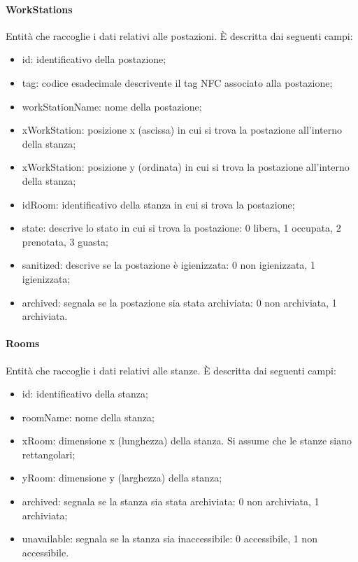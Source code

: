 \paragraph{WorkStations}
Entità che raccoglie i dati relativi alle postazioni. È descritta dai seguenti campi:
\begin{itemize}
	\item id: identificativo della postazione;
	\item tag: codice esadecimale descrivente il tag NFC associato alla postazione;
	\item workStationName: nome della postazione;
	\item xWorkStation: posizione x (ascissa) in cui si trova la postazione all'interno della stanza;
	\item xWorkStation: posizione y (ordinata) in cui si trova la postazione all'interno della stanza;
	\item idRoom: identificativo della stanza in cui si trova la postazione;
	\item state: descrive lo stato in cui si trova la postazione: 0 libera, 1 occupata, 2 prenotata, 3 guasta;
	\item sanitized: descrive se la postazione è igienizzata: 0 non igienizzata, 1 igienizzata; 
	\item archived: segnala se la postazione sia stata archiviata: 0 non archiviata, 1 archiviata.
\end{itemize}

\paragraph{Rooms}
Entità che raccoglie i dati relativi alle stanze. È descritta dai seguenti campi:
\begin{itemize}
	\item id: identificativo della stanza;
	\item roomName: nome della stanza;
	\item xRoom: dimensione x (lunghezza) della stanza. Si assume che le stanze siano rettangolari;
	\item yRoom: dimensione y (larghezza) della stanza;
	\item archived: segnala se la stanza sia stata archiviata: 0 non archiviata, 1 archiviata;
	\item unavailable: segnala se la stanza sia inaccessibile: 0 accessibile, 1 non accessibile.
\end{itemize}
